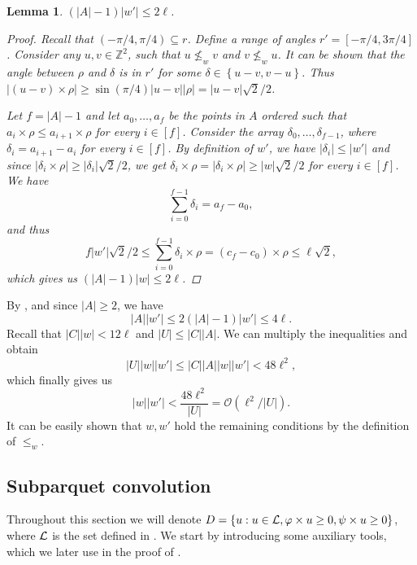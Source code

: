 \documentclass[11pt]{article}
\newcommand{\Z}{\mathbb{Z}}
\renewcommand{\O}{\mathcal{O}}
\newcommand{\set}[1]{\left\lbrace #1 \right\rbrace}
\theoremstyle{plain}
\newtheorem{lemma}{Lemma}
\theoremstyle{definition}
\theoremstyle{remark}
\begin{document}
\begin{lemma}\label{A_ineq}
	$(|A| - 1) |w'| \le 2\ell$. 
	\begin{proof}
		Recall that $(-\pi / 4, \pi / 4) \subseteq r$.
		Define a range of angles $r' = [-\pi / 4, 3\pi / 4]$.
		Consider any $u, v \in \Z^2$, such that $u \not \le_w v$ and $v \not \le_w u$.
		It can be shown that the angle between $\rho$ and $\delta$ is in $r'$ for some $\delta \in \set{u - v, v - u}$.
		Thus $|(u - v) \times \rho| \ge \sin(\pi / 4) |u - v||\rho| = |u - v|\sqrt{2} / 2$.
		
		Let $f = |A| - 1$ and let $a_0, \dots, a_{f}$ be the points in $A$ ordered such that $a_i \times \rho \le a_{i + 1} \times \rho$ for every $i \in [f]$.
		Consider the array $\delta_0, \dots, \delta_{f - 1}$, where $\delta_i = a_{i + 1} - a_i$ for every $i \in [f]$.
		By definition of $w'$, we have $|\delta_i| \le |w'|$ and since $|\delta_i \times \rho| \ge |\delta_i|\sqrt{2} / 2$, we get $\delta_i \times \rho = |\delta_i \times \rho| \ge |w| \sqrt{2} / 2$ for every $i \in [f]$.
		We have
		\[ \sum_{i = 0}^{f - 1} \delta_i = a_f - a_0,\]
		and thus
		\[ f|w'| \sqrt{2}/2 \le \sum_{i = 0}^{f - 1} \delta_i \times \rho = (c_f - c_0) \times \rho \le \ell \sqrt{2}, \]
		which gives us $(|A| - 1)|w| \le 2\ell$.
	\end{proof}
\end{lemma}

By , and since $|A| \ge 2$, we have
\[|A||w'| \le 2(|A| - 1) |w'| \le 4\ell.\]
Recall that $|C||w| < 12\ell$ and $|U| \le |C| |A|$. We can multiply the inequalities and obtain
\[ |U||w||w'| \le |C||A||w||w'| < 48 \ell^2,\]
which finally gives us
\[|w||w'| < \frac{48\ell^2}{|U|} = \O(\ell^2 / |U|). \]
It can be easily shown that $w, w'$ hold the remaining conditions by the definition of $\le_w$.


\newcommand{\W}{\mathcal{W}}
\subsection{Subparquet convolution} \label{subparquet_convolution_proof}

Throughout this section we will denote $D = \set{u : u \in \L, \h{u} \ge 0, \s{u} \ge 0}$, where $\mathcal{L}$ is the set defined in .
We start by introducing some auxiliary tools, which we later use in the proof of .
\end{document}
